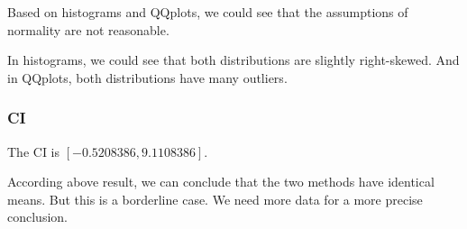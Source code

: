 \documentclass[12pt,letterpaper,titlepage,en-US]{article}
\begin{document}
Based on histograms and QQplots, we could see that the assumptions of normality are not reasonable.

In histograms, we could see that both distributions are slightly right-skewed.
And in QQplots, both distributions have many outliers.

\subsubsection{CI}

The CI is $[-0.5208386, 9.1108386]$.

According above result, we can conclude that the two methods have identical means.
But this is a borderline case. We need more data for a more precise conclusion.


\subsection{}
\end{document}
